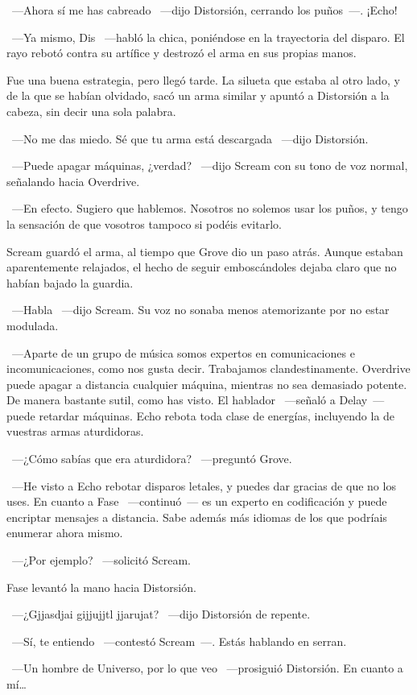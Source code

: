 ~---Ahora sí me has cabreado ~---dijo Distorsión, cerrando los puños~---. ¡Echo!

~---Ya mismo, Dis ~---habló la chica, poniéndose en la trayectoria del disparo. El rayo rebotó contra su artífice y destrozó el arma en sus propias manos.

Fue una buena estrategia, pero llegó tarde. La silueta que estaba al otro lado, y de la que se habían olvidado, sacó un arma similar y apuntó a Distorsión a la cabeza, sin decir una sola palabra.

~---No me das miedo. Sé que tu arma está descargada ~---dijo Distorsión.

~---Puede apagar máquinas, ¿verdad? ~---dijo Scream con su tono de voz normal, señalando hacia Overdrive.

~---En efecto. Sugiero que hablemos. Nosotros no solemos usar los puños, y tengo la sensación de que vosotros tampoco si podéis evitarlo.

Scream guardó el arma, al tiempo que Grove dio un paso atrás. Aunque estaban aparentemente relajados, el hecho de seguir emboscándoles dejaba claro que no habían bajado la guardia.

~---Habla ~---dijo Scream. Su voz no sonaba menos atemorizante por no estar modulada.

~---Aparte de un grupo de música somos expertos en comunicaciones e incomunicaciones, como nos gusta decir. Trabajamos clandestinamente. Overdrive puede apagar a distancia cualquier máquina, mientras no sea demasiado potente. De manera bastante sutil, como has visto. El hablador ~---señaló a Delay~--- puede retardar máquinas. Echo rebota toda clase de energías, incluyendo la de vuestras armas aturdidoras.

~---¿Cómo sabías que era aturdidora? ~---preguntó Grove.

~---He visto a Echo rebotar disparos letales, y puedes dar gracias de que no los uses. En cuanto a Fase ~---continuó~--- es un experto en codificación y puede encriptar mensajes a distancia. Sabe además más idiomas de los que podríais enumerar ahora mismo.

~---¿Por ejemplo? ~---solicitó Scream.

Fase levantó la mano hacia Distorsión.

~---¿Gjjasdjai gijjujjtl jjarujat? ~---dijo Distorsión de repente.

~---Sí, te entiendo ~---contestó Scream~---. Estás hablando en serran.

~---Un hombre de Universo, por lo que veo ~---prosiguió Distorsión. En cuanto a mí\dots

